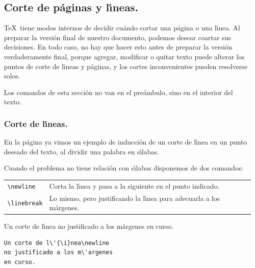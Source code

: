 {\begin{enumerate}
\end{enumerate}

\subsection{Corte de p{\'a}ginas y l{\'\i}neas.}

\TeX\ tiene modos internos de decidir cu{\'a}ndo cortar una p{\'a}gina o
una l\'{\i}nea. Al preparar la versi{\'o}n final de nuestro documento,
podemos desear coartar sus decisiones. En todo caso, no hay que hacer
esto antes de preparar la versi{\'o}n verdaderamente final, porque
agregar, modificar o quitar texto puede alterar los puntos de corte
de l\'{\i}neas y p{\'a}ginas, y los cortes inconvenientes pueden
resolverse solos. 

Los comandos de esta secci{\'o}n no van en el pre{\'a}mbulo, sino en el
interior del texto. 

\subsubsection{Corte de l{\'\i}neas.}

En la p{\'a}gina \pageref{silabas} ya vimos un ejemplo de inducci{\'o}n
de un corte de l\'{\i}nea en un punto deseado del texto, al dividir
una palabra en s\'{\i}labas.

Cuando el problema no tiene relaci{\'o}n con s\'{\i}labas disponemos de
dos comandos:

\vspace{.3cm}
\begin{tabular}{lp{8cm}}
\verb+\newline+ & Corta la l\'{\i}nea y pasa a la siguiente en el
punto indicado. \\[.3cm]
\verb+\linebreak+ & Lo mismo, pero justificando la l\'{\i}nea para
adecuarla a los m{\'a}rgenes.
\end{tabular}
\vspace{.3cm}

\vspace{.3cm}
{\small
\begin{minipage}[t]{5cm}
Un corte de l\'{\i}nea\newline
no justificado a los m{\'a}rgenes en curso.
\end{minipage}
\hspace{1cm}
\begin{minipage}[t]{5cm}
\begin{verbatim}
Un corte de l\'{\i}nea\newline
no justificado a los m\'argenes
en curso.
\end{verbatim}
\end{minipage}

}}
